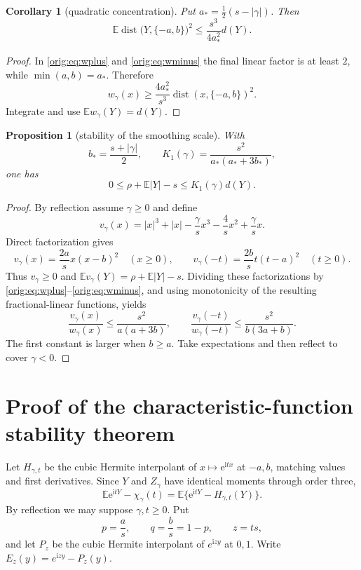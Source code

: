 \documentclass[11pt,a4paper]{article}
\numberwithin{equation}{section}
\newtheorem{proposition}[theorem]{Proposition}
\newtheorem{corollary}[theorem]{Corollary}
\theoremstyle{definition}
\theoremstyle{remark}
\newcommand{\E}{\mathbb E}
\newcommand{\ii}{\mathrm i}
\newcommand{\e}{\mathrm e}
\begin{document}
\begin{corollary}[quadratic concentration]\label{orig:cor:transport}
Put $a_*=\tfrac12(s-|\gamma|)$.  Then
\[
 \E\operatorname{dist}\bigl(Y,\{-a,b\}\bigr)^2
 \le\frac{s^3}{4a_*^2}d(Y).
\]
\end{corollary}

\begin{proof}
In \eqref{orig:eq:wplus} and \eqref{orig:eq:wminus} the final linear factor is at
least $2$, while $\min(a,b)=a_*$.  Therefore
\[
 w_\gamma(x)\ge\frac{4a_*^2}{s^3}
 \operatorname{dist}(x,\{-a,b\})^2.
\]
Integrate and use $\E w_\gamma(Y)=d(Y)$.
\end{proof}

\begin{proposition}[stability of the smoothing scale]\label{orig:prop:m1}
With
\[
 b_*=\frac{s+|\gamma|}{2},\qquad
 K_1(\gamma)=\frac{s^2}{a_*(a_*+3b_*)},
\]
one has
\[
 0\le \rho+\E|Y|-s\le K_1(\gamma)d(Y).
\]
\end{proposition}

\begin{proof}
By reflection assume $\gamma\ge0$ and define
\[
 v_\gamma(x)=|x|^3+|x|-\frac\gamma s x^3
              -\frac4s x^2+\frac\gamma s x.
\]
Direct factorization gives
\[
 v_\gamma(x)=\frac{2a}{s}x(x-b)^2\quad(x\ge0),
 \qquad
 v_\gamma(-t)=\frac{2b}{s}t(t-a)^2\quad(t\ge0).
\]
Thus $v_\gamma\ge0$ and
$\E v_\gamma(Y)=\rho+\E|Y|-s$.  Dividing these factorizations by
\eqref{orig:eq:wplus}--\eqref{orig:eq:wminus}, and using monotonicity of the
resulting fractional-linear functions, yields
\[
 \frac{v_\gamma(x)}{w_\gamma(x)}
 \le\frac{s^2}{a(a+3b)},\qquad
 \frac{v_\gamma(-t)}{w_\gamma(-t)}
 \le\frac{s^2}{b(3a+b)}.
\]
The first constant is larger when $b\ge a$.  Take expectations and then
reflect to cover $\gamma<0$.
\end{proof}

\section{Proof of the characteristic-function stability theorem}

Let $H_{\gamma,t}$ be the cubic Hermite interpolant of $x\mapsto \e^{\ii tx}$
at $-a,b$, matching values and first derivatives.  Since $Y$ and
$Z_\gamma$ have identical moments through order three,
\begin{equation}\label{orig:eq:momentcancel}
 \E\e^{\ii tY}-\chi_\gamma(t)
 =\E\{\e^{\ii tY}-H_{\gamma,t}(Y)\}.
\end{equation}
By reflection we may suppose $\gamma,t\ge0$.  Put
\[
 p=\frac as,\qquad q=\frac bs=1-p,
 \qquad z=ts,
\]
and let $P_z$ be the cubic Hermite interpolant of $e^{\ii zy}$ at
$0,1$.  Write $E_z(y)=e^{\ii zy}-P_z(y)$.
\end{document}
